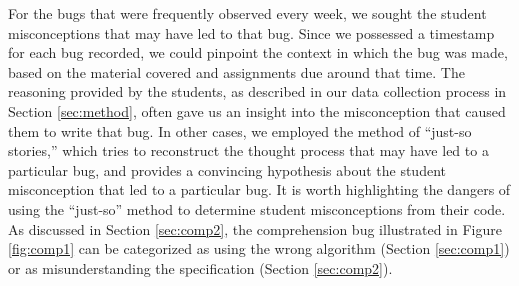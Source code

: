 \documentclass[11pt,letterpaper]{article}
\begin{document}
For the bugs that were frequently observed every week, we sought the student misconceptions that may have led to that bug. Since we possessed a timestamp for each bug recorded, we could pinpoint the context in which the bug was made, based on the material covered and assignments due around that time. The reasoning provided by the students, as described in our data collection process in Section \ref{sec:method}, often gave us an insight into the misconception that caused them to write that bug. In other cases, we employed the method of ``just-so stories,'' \cite{JoniSolowayGoldmanEhrlich83} which tries to reconstruct the thought process that may have led to a particular bug, and provides a convincing hypothesis about the student misconception that led to a particular bug. It is worth highlighting the dangers of using the ``just-so'' method to determine student misconceptions from their code. As discussed in Section \ref{sec:comp2}, the comprehension bug illustrated in Figure \ref{fig:comp1} can be categorized as using the wrong algorithm (Section \ref{sec:comp1}) or as misunderstanding the specification (Section \ref{sec:comp2}).\\
\end{document}
